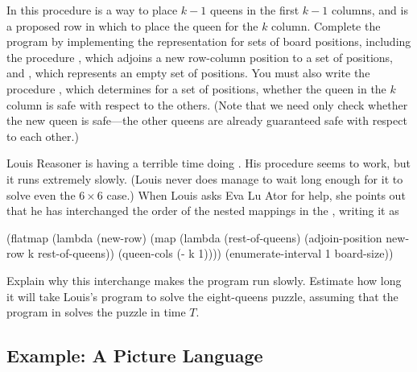 \begin{exercise}
	In this procedure  is a way to place \( k - 1 \) queens in the first \( k - 1 \) columns, and  is a proposed row in which to place the queen for the \( k \) column.
	Complete the program by implementing the representation for sets of board positions, including the procedure , which adjoins a new row-column position to a set of positions, and , which represents an empty set of positions.
	You must also write the procedure , which determines for a set of positions, whether the queen in the \( k \) column is safe with respect to the others.
	(Note that we need only check whether the new queen is safe---the other queens are already guaranteed safe with respect to each other.)
\end{exercise}



\begin{exercise}
	\label{Exercise 2.43}
	Louis Reasoner is having a terrible time doing .
	His  procedure seems to work, but it runs extremely slowly.
	(Louis never does manage to wait long enough for it to solve even the \( 6 × 6 \) case.)
	When Louis asks Eva Lu Ator for help, she points out that he has interchanged the order of the nested mappings in the , writing it as
	\begin{scheme}
	  (flatmap
	   (lambda (new-row)
	     (map (lambda (rest-of-queens)
	            (adjoin-position new-row k rest-of-queens))
	          (queen-cols (- k 1))))
	   (enumerate-interval 1 board-size))
	\end{scheme}
	Explain why this interchange makes the program run slowly.
	Estimate how long it will take Louis’s program to solve the eight-queens puzzle, assuming that the program in  solves the puzzle in time \( T \).
\end{exercise}



\subsection{Example: A Picture Language}
\label{Section 2.2.4}

